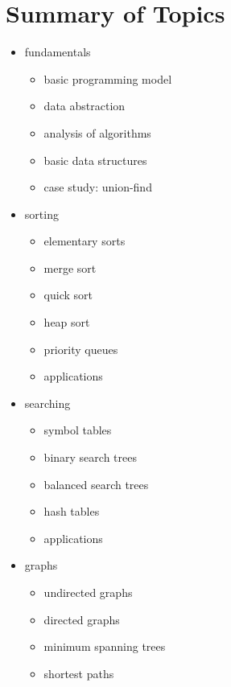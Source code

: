 \documentclass[8pt,a4paper,compress,handout]{beamer}
\begin{document}
\section{Summary of Topics}
\begin{frame}[fragile]
\begin{itemize}
\item fundamentals
\begin{itemize}
\item basic programming model 
\item data abstraction
\item analysis of algorithms
\item basic data structures
\item case study: union-find
\end{itemize}

\item sorting
\begin{itemize}
\item elementary sorts
\item merge sort
\item quick sort 
\item heap sort
\item priority queues
\item applications
\end{itemize}

\end{itemize}
\end{frame}

\begin{frame}[fragile]
\begin{itemize}
\item searching
\begin{itemize}
\item symbol tables
\item binary search trees 
\item balanced search trees
\item hash tables
\item applications
\end{itemize}

\item graphs
\begin{itemize}
\item undirected graphs
\item directed graphs 
\item minimum spanning trees
\item shortest paths
\end{itemize}

\end{itemize}
\end{frame}
\end{document}
